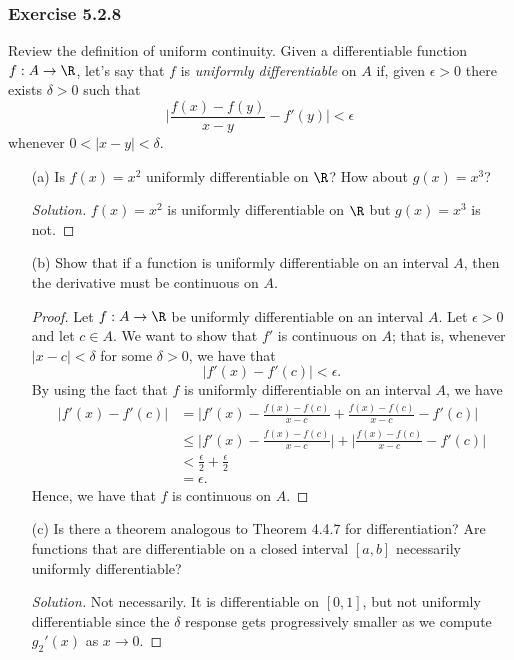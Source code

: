 \subsubsection{Exercise 5.2.8} Review the definition of uniform continuity. Given a differentiable function \( f: A \to \R  \), let's say that \( f  \) is \textit{uniformly differentiable} on \( A  \) if, given \( \epsilon > 0  \) there exists \( \delta > 0  \) such that 
\[\Big| \frac{ f(x) - f(y)  }{ x - y  } - f'(y) \Big| < \epsilon   \] whenever \(  0 < | x - y  |  < \delta  \).
\begin{enumerate}
    \item[(a)] Is \( f(x) = x^2  \) uniformly differentiable on \( \R  \)? How about \( g(x) = x^3 \)?
        \begin{proof}[Solution]
        \( f(x) = x^2  \) is uniformly differentiable on \( \R  \) but \( g(x) =x^3  \) is not.
        \end{proof}
    \item[(b)] Show that if a function is uniformly differentiable on an interval \( A  \), then the derivative must be continuous on \( A  \).
        \begin{proof}
        Let \( f: A \to \R  \) be uniformly differentiable on an interval \( A  \). Let \( \epsilon > 0  \) and let \( c \in A  \). We want to show that \( f'  \) is continuous on \(  A  \); that is, whenever \( |  x - c  | < \delta  \) for some \( \delta > 0  \), we have that 
        \[ | f'(x) - f'(c) | < \epsilon. \]
    By using the fact that \( f  \) is uniformly differentiable on an interval \( A  \), we have 
    \begin{align*}
        | f'(x) - f'(c) | &= \Big| f'(x) - \frac{ f(x) - f(c)  }{ x - c  } + \frac{ f(x) - f(c)  }{ x - c  } - f'(c)  \Big|  \\
                          &\leq \Big| f'(x) - \frac{ f(x) - f(c)  }{ x - c  }  \Big| + \Big| \frac{ f(x) -f(c)  }{ x - c  } - f'(c)  \Big| \\
                          &< \frac{ \epsilon  }{ 2 } + \frac{ \epsilon  }{ 2 } \\
                          &= \epsilon.
    \end{align*}
    Hence, we have that \( f  \) is continuous on \( A  \).
        \end{proof}
    \item[(c)] Is there a theorem analogous to Theorem 4.4.7 for differentiation? Are functions that are differentiable on a closed interval \( [a,b] \) necessarily uniformly differentiable?
        \begin{proof}[Solution]
            Not necessarily. It is differentiable on \( [0,1]  \), but not uniformly differentiable since the \( \delta  \) response gets progressively smaller as we compute \( g_2'(x)  \) as \( x \to 0  \).
        \end{proof}
\end{enumerate}


